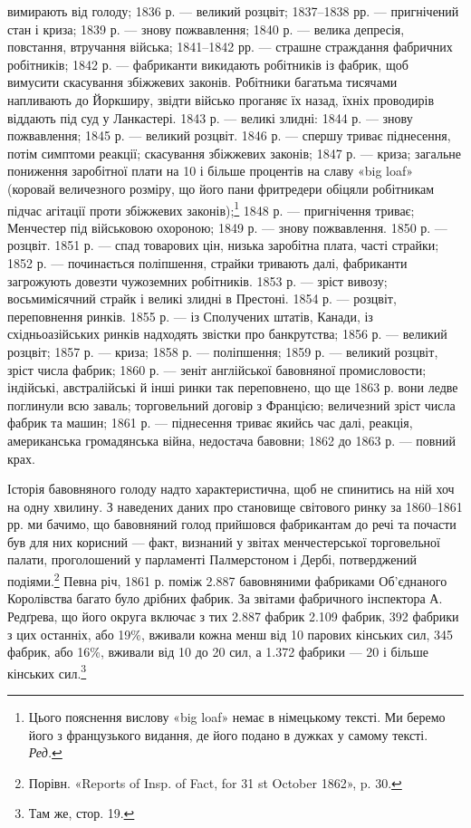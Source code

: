 \parcont{}  %
вимирають від голоду; 1836 р. — великий розцвіт; 1837--1838 рр. —
пригнічений стан і криза; 1839 р. — знову пожвавлення; 1840 р. —
велика депресія, повстання, втручання війська; 1841--1842 рр. —
страшне страждання фабричних робітників; 1842 р. — фабриканти
викидають робітників із фабрик, щоб вимусити скасування збіжжевих
законів. Робітники багатьма тисячами напливають до
Йоркширу, звідти військо проганяє їх назад, їхніх проводирів
віддають під суд у Ланкастері. 1843 р. — великі злидні: 1844 р. —
знову пожвавлення; 1845 р. — великий розцвіт. 1846 р. — спершу
триває піднесення, потім симптоми реакції; скасування збіжжевих
законів; 1847 р. — криза; загальне пониження заробітної плати
на 10 і більше процентів на славу «big loaf» (коровай величезного
розміру, що його пани фритредери обіцяли робітникам підчас
агітації проти збіжжевих законів);\footnote*{
Цього пояснення вислову «big loaf» немає в німецькому тексті.
Ми беремо його з французького видання, де його подано в дужках у самому
тексті. \emph{Ред.}
} 1848 р. — пригнічення триває;
Менчестер під військовою охороною; 1849 р. — знову пожвавлення.
1850 р. — розцвіт. 1851 р. — спад товарових цін, низька
заробітна плата, часті страйки; 1852 р. — починається поліпшення,
страйки тривають далі, фабриканти загрожують довезти чужоземних
робітників. 1853 р. — зріст вивозу; восьмимісячний страйк
і великі злидні в Престоні. 1854 р. — розцвіт, переповнення ринків.
1855 р. — із Сполучених штатів, Канади, із східньоазійських
ринків надходять звістки про банкрутства; 1856 р. — великий
розцвіт; 1857 р. — криза; 1858 р. — поліпшення; 1859 р. — великий
розцвіт, зріст числа фабрик; 1860 р. — зеніт англійської
бавовняної промисловости; індійські, австралійські й інші ринки
так переповнено, що ще 1863 р. вони ледве поглинули всю заваль;
торговельний договір з Францією; величезний зріст числа фабрик
та машин; 1861 р. — піднесення триває якийсь час далі, реакція,
американська громадянська війна, недостача бавовни; 1862 до
1863 р. — повний крах.

Історія бавовняного голоду надто характеристична, щоб не
спинитись на ній хоч на одну хвилину. З наведених даних про
становище світового ринку за 1860--1861 рр. ми бачимо, що
бавовняний голод прийшовся фабрикантам до речі та почасти був
для них корисний — факт, визнаний у звітах менчестерської
торговельної палати, проголошений у парламенті Палмерстоном
і Дербі, потверджений подіями.\footnote{
Порівн. «Reports of Insp. of Fact, for 31 st October 1862», p. 30.
} Певна річ, 1861 р.
поміж 2.887 бавовняними фабриками Об’єднаного Королівства
багато було дрібних фабрик. За звітами фабричного інспектора
А. Редґрева, що його округа включає з тих 2.887 фабрик 2.109 фабрик,
392 фабрики з цих останніх, або 19\%, вживали кожна
менш від 10 парових кінських сил, 345 фабрик, або 16\%, вживали
від 10 до 20 сил, а 1.372 фабрики — 20 і більше кінських сил.\footnote{
Там же, стор. 19.
}
\parbreak{}  %
